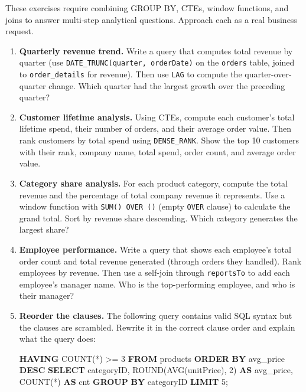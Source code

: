 \documentclass[
  letterpaper,
  DIV=11,
  numbers=noendperiod]{scrreprt}
\newenvironment{Shaded}{\begin{snugshade}}{\end{snugshade}}
\newcommand{\DecValTok}[1]{\textcolor[rgb]{0.68,0.00,0.00}{#1}}
\newcommand{\FunctionTok}[1]{\textcolor[rgb]{0.28,0.35,0.67}{#1}}
\newcommand{\KeywordTok}[1]{\textcolor[rgb]{0.00,0.23,0.31}{\textbf{#1}}}
\newcommand{\NormalTok}[1]{\textcolor[rgb]{0.00,0.23,0.31}{#1}}
\newcommand{\OperatorTok}[1]{\textcolor[rgb]{0.37,0.37,0.37}{#1}}
\begin{document}
These exercises require combining GROUP BY, CTEs, window functions, and
joins to answer multi-step analytical questions. Approach each as a real
business request.

\begin{enumerate}
\def\labelenumi{\arabic{enumi}.}
\item
  \textbf{Quarterly revenue trend.} Write a query that computes total
  revenue by quarter (use
  \texttt{DATE\_TRUNC(\textquotesingle{}quarter\textquotesingle{},\ orderDate)}
  on the \texttt{orders} table, joined to \texttt{order\_details} for
  revenue). Then use \texttt{LAG} to compute the quarter-over-quarter
  change. Which quarter had the largest growth over the preceding
  quarter?
\item
  \textbf{Customer lifetime analysis.} Using CTEs, compute each
  customer's total lifetime spend, their number of orders, and their
  average order value. Then rank customers by total spend using
  \texttt{DENSE\_RANK}. Show the top 10 customers with their rank,
  company name, total spend, order count, and average order value.
\item
  \textbf{Category share analysis.} For each product category, compute
  the total revenue and the percentage of total company revenue it
  represents. Use a window function with \texttt{SUM()\ OVER\ ()} (empty
  \texttt{OVER} clause) to calculate the grand total. Sort by revenue
  share descending. Which category generates the largest share?
\item
  \textbf{Employee performance.} Write a query that shows each
  employee's total order count and total revenue generated (through
  orders they handled). Rank employees by revenue. Then use a self-join
  through \texttt{reportsTo} to add each employee's manager name. Who is
  the top-performing employee, and who is their manager?
\item
  \textbf{Reorder the clauses.} The following query contains valid SQL
  syntax but the clauses are scrambled. Rewrite it in the correct clause
  order and explain what the query does:

  \begin{codelisting}

  \caption{\texttt{duckdb}}

\begin{Shaded}
\begin{Highlighting}[]
\KeywordTok{HAVING} \FunctionTok{COUNT}\NormalTok{(}\OperatorTok{*}\NormalTok{) }\OperatorTok{\textgreater{}=} \DecValTok{3}
\KeywordTok{FROM}\NormalTok{ products}
\KeywordTok{ORDER} \KeywordTok{BY}\NormalTok{ avg\_price }\KeywordTok{DESC}
\KeywordTok{SELECT}\NormalTok{ categoryID, }\FunctionTok{ROUND}\NormalTok{(}\FunctionTok{AVG}\NormalTok{(unitPrice), }\DecValTok{2}\NormalTok{) }\KeywordTok{AS}\NormalTok{ avg\_price, }\FunctionTok{COUNT}\NormalTok{(}\OperatorTok{*}\NormalTok{) }\KeywordTok{AS}\NormalTok{ cnt}
\KeywordTok{GROUP} \KeywordTok{BY}\NormalTok{ categoryID}
\KeywordTok{LIMIT} \DecValTok{5}\NormalTok{;}
\end{Highlighting}
\end{Shaded}


\end{codelisting}
\end{enumerate}
\end{document}
